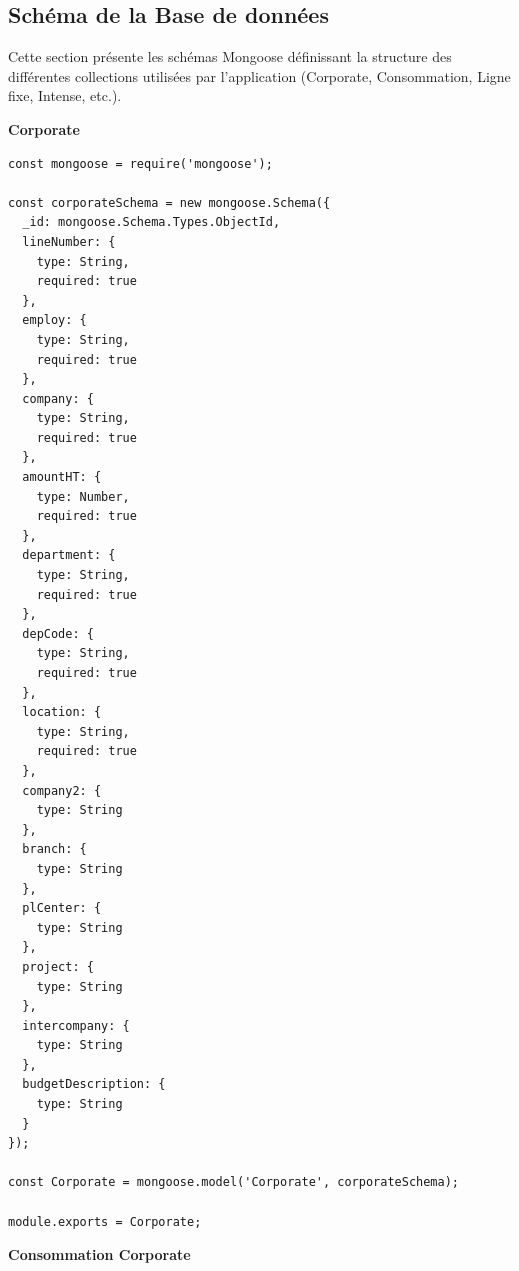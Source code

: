 \documentclass[a4paper,11pt]{report}
\begin{document}
\newpage
\subsection{Schéma de la Base de données}

Cette section présente les schémas Mongoose définissant la structure des différentes collections utilisées par l’application (Corporate, Consommation, Ligne fixe, Intense, etc.).

\textbf{Corporate}

\begin{lstlisting}[caption=Corporate Model – models/Corporate.js, label={lst:corporate_model}]
const mongoose = require('mongoose');

const corporateSchema = new mongoose.Schema({
  _id: mongoose.Schema.Types.ObjectId,
  lineNumber: {
    type: String,
    required: true
  },
  employ: {
    type: String,
    required: true
  },
  company: {
    type: String,
    required: true
  },
  amountHT: {
    type: Number,
    required: true
  },
  department: {
    type: String,
    required: true
  },
  depCode: {
    type: String,
    required: true
  },
  location: {
    type: String,
    required: true
  },
  company2: {
    type: String
  },
  branch: {
    type: String
  },
  plCenter: {
    type: String
  },
  project: {
    type: String
  },
  intercompany: {
    type: String
  },
  budgetDescription: {
    type: String
  }
});

const Corporate = mongoose.model('Corporate', corporateSchema);

module.exports = Corporate;
\end{lstlisting}




\textbf{Consommation Corporate}
\end{document}
